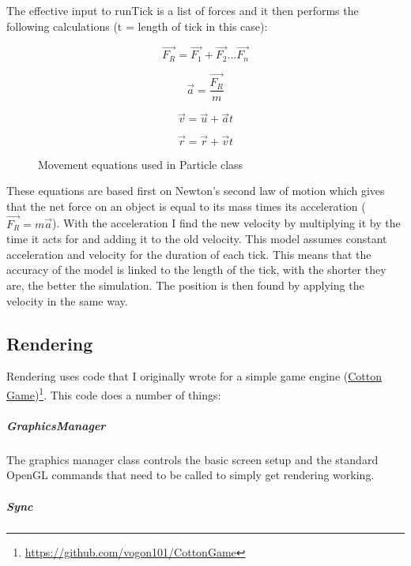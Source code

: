 			The effective input to runTick is a list of forces and it then performs the following calculations (t = length of tick in this case):
			
			\begin{figure}
				\begin{equation}
					\vec{F_{R}} = \vec{F_{1}} + \vec{F_{2}} ... \vec{F_{n}}
				\end{equation}
				
				\begin{equation}
					\vec{a} = \frac{\vec{F_{R}}}{m}
				\end{equation}
				
				\begin{equation}
					\vec{v} = \vec{u} + \vec{a}t
				\end{equation}
				
				\begin{equation}
					\vec{r} = \vec{r} + \vec{v}t
				\end{equation}
				\caption{Movement equations used in Particle class}
				\label{fig:movEqn}
			\end{figure}
		
			These equations are based first on Newton's second law of motion which gives that the net force on an object is equal to its mass times its acceleration ($\vec{F_{R}} = m\vec{a}$). With the acceleration I find the new velocity by multiplying it by the time it acts for and adding it to the old velocity. This model assumes constant acceleration and velocity for the duration of each tick. This means that the accuracy of the model is linked to the length of the tick, with the shorter they are, the better the simulation. The position is then found by applying the velocity in the same way.
	\newpage
	\subsection{Rendering}
		
		Rendering uses code that I originally wrote for a simple game engine (\href{https://github.com/vogon101/CottonGame}{Cotton Game})\footnote{\url{https://github.com/vogon101/CottonGame}}. This code does a number of things:
		
		\subparagraph{GraphicsManager} 
			
			The graphics manager class controls the basic screen setup and the standard OpenGL commands that need to be called to simply get rendering working.
		
		\subparagraph{Sync} 
		
